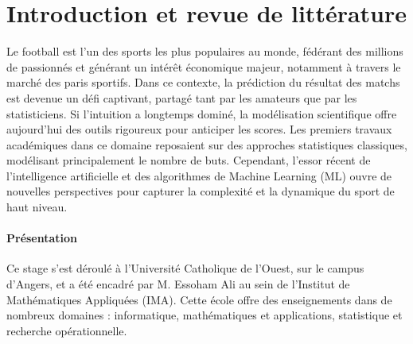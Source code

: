 \chapter{Introduction et revue de littérature}


Le football est l'un des sports les plus populaires au monde, fédérant des 
millions de passionnés et générant un intérêt économique majeur, notamment à 
travers le marché des paris sportifs. Dans ce contexte, la prédiction du 
résultat des matchs est devenue un défi captivant, partagé tant par les amateurs 
que par les statisticiens. 
Si l'intuition a longtemps dominé, la modélisation 
scientifique offre aujourd'hui des outils rigoureux pour anticiper les scores. 
Les premiers travaux académiques dans ce domaine reposaient sur des approches 
statistiques classiques, modélisant principalement le nombre de buts. 
Cependant, l'essor récent de l'intelligence artificielle et des algorithmes de 
Machine Learning (ML) ouvre de nouvelles perspectives pour capturer la complexité et 
la dynamique du sport de haut niveau.\\


\subsubsection{Présentation}

Ce stage s'est déroulé à l'Université Catholique de l'Ouest, sur le campus 
d'Angers, et a été encadré par M. Essoham Ali au sein de l'Institut de Mathématiques 
Appliquées (IMA). Cette école offre des enseignements dans de nombreux domaines 
: informatique, mathématiques et applications, statistique et recherche opérationnelle.

